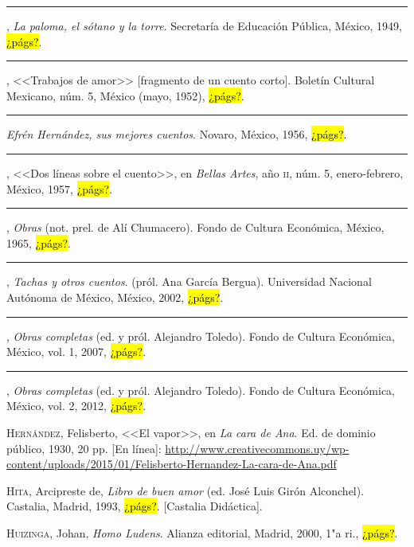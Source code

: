 \documentclass[14pt,twoside,final]{extbook} %
\begin{document}
\rule{1cm}{0.4pt}, \emph{La paloma, el sótano y la torre}. Secretaría de Educación Pública, México, 1949, \hl{¿págs?}.\label{bib:hernandez1949}

\rule{1cm}{0.4pt}, <<Trabajos de amor>> [fragmento de un cuento corto]. Boletín Cultural Mexicano, núm. 5, México (mayo, 1952), \hl{¿págs?}.\label{bib:hernandez1952}

\rule{1cm}{0.4pt} \emph{Efrén Hernández, sus mejores cuentos}. Novaro, México, 1956, \hl{¿págs?}.\label{bib:hernandez1956}

\rule{1cm}{0.4pt}, <<Dos líneas sobre el cuento>>, en \emph{Bellas Artes}, año \textsc{ii}, núm. 5, enero-febrero, México, 1957, \hl{¿págs?}.\label{bib:hernandez1957}

\rule{1cm}{0.4pt}, \emph{Obras} (not. prel. de Alí Chumacero). Fondo de Cultura Económica, México, 1965, \hl{¿págs?}.\label{bib:hernandez1965}

\rule{1cm}{0.4pt}, \emph{Tachas y otros cuentos}. (pról. Ana García Bergua). Universidad Nacional Autónoma de México, México, 2002, \hl{¿págs?}.\label{bib:hernandez2002}

\rule{1cm}{0.4pt}, \emph{Obras completas} (ed. y pról. Alejandro Toledo). Fondo de Cultura Económica, México, vol. 1, 2007, \hl{¿págs?}.\label{bib:hernandez2007}

\rule{1cm}{0.4pt}, \emph{Obras completas} (ed. y pról. Alejandro Toledo). Fondo de Cultura Económica, México, vol. 2, 2012, \hl{¿págs?}.\label{bib:hernandez2012}

\textsc{Hernández}, Felisberto, <<El vapor>>, en \emph{La cara de Ana}. Ed. de dominio público, 1930, 20 pp. [En línea]: \href{http://www.creativecommons.uy/wp-content/uploads/2015/01/Felisberto-Hernandez-La-cara-de-Ana.pdf}{http://www.creativecommons.uy/wp-content/uploads/2015/01/Felisberto-Hernandez-La-cara-de-Ana.pdf}

\textsc{Hita}, Arcipreste de, \emph{Libro de buen amor} (ed. José Luis Girón Alconchel). Castalia, Madrid, 1993, \hl{¿págs?}. [Castalia Didáctica].\label{bib:hita1993}

\textsc{Huizinga}, Johan, \emph{Homo Ludens}. Alianza editorial, Madrid, 2000, 1"a ri., \hl{¿págs?}.\label{bib:huizinga2000}
\end{document}
